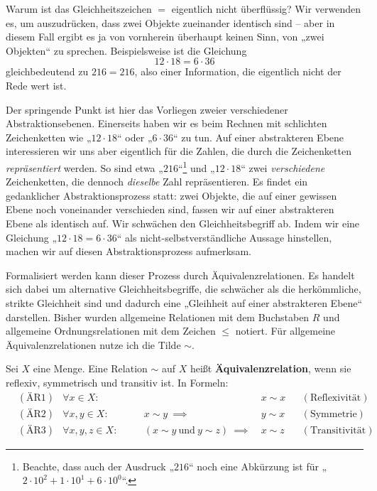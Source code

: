 \begin{bem} \label{aequirelphilo}
    Warum ist das Gleichheitszeichen $=$ eigentlich nicht überflüssig? Wir verwenden es, um auszudrücken, dass zwei Objekte zueinander identisch sind -- aber in diesem Fall ergibt es ja von vornherein überhaupt keinen Sinn, von „zwei Objekten“ zu sprechen. Beispielsweise ist die Gleichung
        \[ 12\cdot 18 = 6\cdot 36 \]
    gleichbedeutend zu $216=216$, also einer Information, die eigentlich nicht der Rede wert ist.
    
    Der springende Punkt ist hier das Vorliegen zweier verschiedener Abstraktionsebenen. Einerseits haben wir es beim Rechnen mit schlichten Zeichenketten wie „$12\cdot 18$“ oder „$6\cdot 36$“ zu tun. Auf einer abstrakteren Ebene interessieren wir uns aber eigentlich für die Zahlen, die durch die Zeichenketten \emph{repräsentiert} werden. So sind etwa „$216$“\footnote{Beachte, dass auch der Ausdruck „$216$“ noch eine Abkürzung ist für „$2\cdot 10^2 + 1\cdot 10^1 + 6 \cdot 10^0$“.} und „$12\cdot 18$“ zwei \emph{verschiedene} Zeichenketten, die dennoch \emph{dieselbe} Zahl repräsentieren. Es findet ein gedanklicher Abstraktionsprozess statt: zwei Objekte, die auf einer gewissen Ebene noch voneinander verschieden sind, fassen wir auf einer abstrakteren Ebene als identisch auf. Wir schwächen den Gleichheitsbegriff ab. Indem wir eine Gleichung „$12\cdot 18=6\cdot 36$“ als nicht-selbstverständliche Aussage hinstellen, machen wir auf diesen Abstraktionsprozess aufmerksam.
    
    Formalisiert werden kann dieser Prozess durch Äquivalenzrelationen. Es handelt sich dabei um alternative Gleichheitsbegriffe, die schwächer als die herkömmliche, strikte Gleichheit sind und dadurch eine „Gleihheit auf einer abstrakteren Ebene“ darstellen. Bisher wurden allgemeine Relationen mit dem Buchstaben $R$ und allgemeine Ordnungsrelationen mit dem Zeichen $\le$ notiert. Für allgemeine Äquivalenzrelationen nutze ich die Tilde $\sim$.
\end{bem}


\begin{defin} \label{def:aequirel} 
    Sei $X$ eine Menge. Eine Relation $\sim$ auf $X$ heißt \textbf{Äquivalenzrelation}, wenn sie reflexiv, symmetrisch und transitiv ist. In Formeln:
    \begin{align*}
        & (\text{ÄR1}) & \forall x\in X:&&\quad & x\sim x && (\text{Reflexivität}) \\
        & (\text{ÄR2}) & \forall x,y\in X:&&\quad x\sim y\ \implies\ & y\sim x && (\text{Symmetrie}) \\
    & (\text{ÄR3}) & \forall x,y,z\in X:&&\quad (x\sim y\ \text{und}\ y\sim z)\ \implies\ & x\sim z && (\text{Transitivität})
    \end{align*}
\end{defin}


